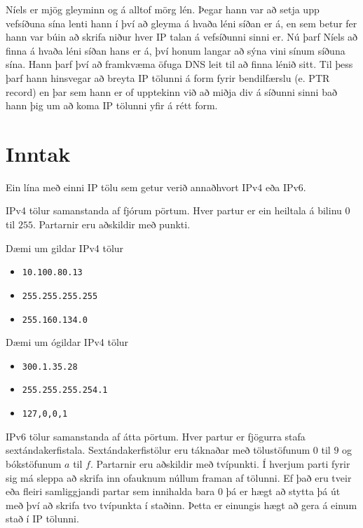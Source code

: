 
Níels er mjög gleyminn og á alltof mörg lén. Þegar hann var að setja upp vefsíðuna sína
lenti hann í því að gleyma á hvaða léni síðan er á, en sem betur fer hann var búin 
að skrifa niður hver IP talan á vefsíðunni sinni er. Nú þarf Níels að finna á hvaða léni 
síðan hans er á, því honum langar að sýna vini sínum síðuna sína. Hann 
þarf því að framkvæma öfuga DNS leit til að finna lénið sitt. Til þess 
þarf hann hinsvegar að breyta IP tölunni á form fyrir bendilfærslu (e. PTR record) 
en þar sem hann er of upptekinn við að miðja div á síðunni 
sinni bað hann þig um að koma IP tölunni yfir á rétt form.

\section*{Inntak}
Ein lína með einni IP tölu sem getur verið annaðhvort IPv4 eða IPv6.

IPv4 tölur samanstanda af fjórum pörtum.
Hver partur er ein heiltala á bilinu $0$ til $255$.
Partarnir eru aðskildir með punkti.

Dæmi um gildar IPv4 tölur
\begin{itemize}
	\item \texttt{10.100.80.13}
	\item \texttt{255.255.255.255}
	\item \texttt{255.160.134.0}
\end{itemize}

Dæmi um ógildar IPv4 tölur
\begin{itemize}
	\item \texttt{300.1.35.28}
	\item \texttt{255.255.255.254.1}
	\item \texttt{127,0,0,1}
\end{itemize}

IPv6 tölur samanstanda af átta pörtum.
Hver partur er fjögurra stafa sextándakerfistala.
Sextándakerfistölur eru táknaðar með tölustöfunum $0$ til $9$ og bókstöfunum $a$ til $f$.
Partarnir eru aðskildir með tvípunkti.
Í hverjum parti fyrir sig má sleppa að skrifa inn ofauknum núllum framan af tölunni.
Ef það eru tveir eða fleiri samliggjandi partar sem innihalda bara 0 þá er hægt að stytta þá út með því að skrifa tvo tvípunkta í staðinn.
Þetta er einungis hægt að gera á einum stað í IP tölunni.

